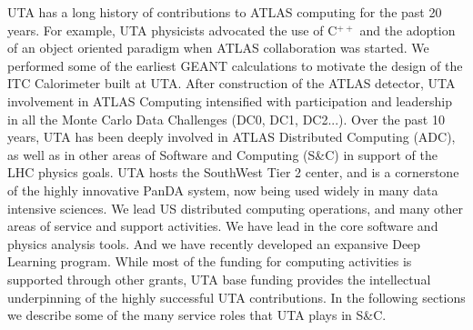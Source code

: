 
UTA has a long history of contributions to ATLAS computing for the
past 20 years. For example, UTA physicists advocated the use of
C$^{++}$ and the adoption of an object oriented paradigm when ATLAS
collaboration was started. We performed some of the earliest GEANT
calculations to motivate the design of the ITC Calorimeter built at
UTA. After construction of the ATLAS detector, UTA involvement in
ATLAS Computing intensified with participation and leadership in all
the Monte Carlo Data Challenges (DC0, DC1, DC2...). Over the past 10
years, UTA has been deeply involved in ATLAS Distributed Computing
(ADC), as well as in other areas of Software and Computing (S\&C) in
support of the LHC physics goals. UTA hosts the SouthWest Tier 2
center, and is a cornerstone of the highly innovative PanDA system,
now being used widely in many data intensive sciences. We lead US
distributed computing operations, and many other areas of service and
support activities. We have lead in the core software and physics
analysis tools. And we have recently developed an expansive Deep
Learning program.  While most of the funding for computing activities
is supported through other grants, UTA base funding provides the
intellectual underpinning of the highly successful UTA
contributions. In the following sections we describe some of the many
service roles that UTA plays in S\&C.


